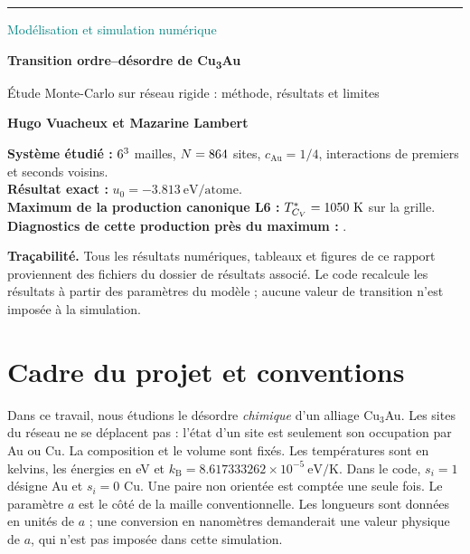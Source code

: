 \documentclass[10pt,a4paper]{article}
\newcommand{\Au}{\mathrm{Au}}
\newcommand{\kb}{k_{\mathrm B}}
\begin{document}
\hypersetup{pageanchor=false}
\begin{titlepage}
\vspace*{5mm}
{\color{teal}\rule{\linewidth}{2pt}}
\vspace{9mm}
{\Large\textcolor{teal}{Modélisation et simulation numérique}\par}
\vspace{8mm}
{\Huge\bfseries\color{navy} Transition ordre--désordre de Cu\textsubscript{3}Au\par}
\vspace{5mm}
{\large Étude Monte-Carlo sur réseau rigide : méthode, résultats et limites\par}
\vspace{5mm}
{\Large\bfseries Hugo Vuacheux et Mazarine Lambert\par}
\vspace{8mm}
\begin{tcolorbox}[colback=pale,colframe=navy,boxrule=.8pt]
\textbf{Système étudié :} $6^3$ mailles, $N=864$ sites,
$c_{\Au}=1/4$, interactions de premiers et seconds voisins.\\[2mm]
\textbf{Résultat exact :} $u_0=-3.813\ \mathrm{eV/atome}$.\\[2mm]
\textbf{Maximum de la production canonique L6 :} $T^*_{C_V}=1050\ \mathrm K$ sur la grille.\\[2mm]
\textbf{Diagnostics de cette production près du maximum :} \DiagnosticStatus.
\end{tcolorbox}
\vfill
\textbf{Traçabilité.} Tous les résultats numériques, tableaux et figures de ce
rapport proviennent des fichiers du dossier de résultats associé. Le code
recalcule les résultats à partir des paramètres du modèle ; aucune valeur
de transition n'est imposée à la simulation.
\vspace{8mm}
\end{titlepage}
\hypersetup{pageanchor=true}
\tableofcontents
\newpage

\section*{Cadre du projet et conventions}
Dans ce travail, nous étudions le désordre \emph{chimique} d'un alliage Cu$_3$Au. Les sites
du réseau ne se déplacent pas : l'état d'un site est seulement son occupation
par Au ou Cu. La composition et le volume sont fixés. Les températures sont
en kelvins, les énergies en eV et $\kb=8.617333262\times10^{-5}\ \mathrm{eV/K}$.
Dans le code, $s_i=1$ désigne Au et $s_i=0$ Cu. Une paire non orientée est
comptée une seule fois.
Le paramètre $a$ est le côté de la maille conventionnelle. Les longueurs
sont données en unités de $a$ ; une conversion en nanomètres demanderait
une valeur physique de $a$, qui n'est pas imposée dans cette simulation.
\end{document}
